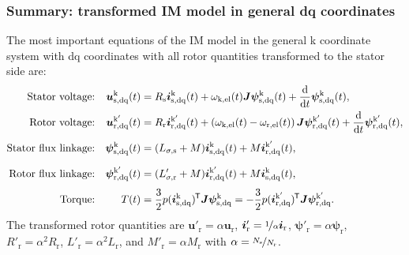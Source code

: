 \begin{frame}
	\frametitle{Summary: transformed IM model in general dq coordinates}
    The most important equations of the IM model in the general k coordinate system with dq coordinates with all rotor quantities transformed to the stator side are:
    \begin{equation*}
        \begin{alignedat}{4}
            &&\mbox{Stator voltage:}&& \quad\bm{u}^\mathrm{k}_\mathrm{s,dq}(&t) &&= R_\mathrm{s} \bm{i}^\mathrm{k}_\mathrm{s,dq}(t)+ \omega_\mathrm{k,el}(t)\bm{J}\bm{\psi}^\mathrm{k}_\mathrm{s,dq}(t) + \frac{\mathrm{d}}{\mathrm{d}t}\bm{\psi}^\mathrm{k}_\mathrm{s,dq}(t),\\
            &&\mbox{Rotor voltage:}&& \quad\bm{u}^{\mathrm{k}'}_\mathrm{r,dq}(&t) &&= R_\mathrm{r} \bm{i}^{\mathrm{k}'}_\mathrm{r,dq}(t)+\left(\omega_\mathrm{k,el}(t)-\omega_\mathrm{r,el}(t)\right)\bm{J}\bm{\psi}^{\mathrm{k}'}_\mathrm{r,dq}(t) +\frac{\mathrm{d}}{\mathrm{d}t}\bm{\psi}^{\mathrm{k}'}_\mathrm{r,dq}(t),\\
            &&\mbox{Stator flux linkage:}&& \quad \bm{\psi}^\mathrm{k}_\mathrm{s,dq}(&t) &&= (L_{\sigma,\mathrm{s}} +M) \bm{i}^\mathrm{k}_\mathrm{s,dq}(t) +  M\bm{i}^{\mathrm{k}'}_\mathrm{r,dq}(t),\vphantom{\frac{\mathrm{d}}{\mathrm{d}t}}\\
            &&\mbox{Rotor flux linkage:}&& \quad \bm{\psi}^{\mathrm{k}'}_\mathrm{r,dq}(&t) &&= (L'_{\sigma,\mathrm{r}} + M) \bm{i}^{\mathrm{k}'}_\mathrm{r,dq}(t) +  M \bm{i}^\mathrm{k}_\mathrm{s,dq}(t)\vphantom{\frac{\mathrm{d}}{\mathrm{d}t}},\\
            &&\mbox{Torque:}&& \quad T(&t) &&= \frac{3}{2} p (\bm{i}_\mathrm{s,dq}^\mathrm{k})\T\bm{J}\bm{\psi}_\mathrm{s,dq}^\mathrm{k}=-\frac{3}{2} p (\bm{i}^{\mathrm{k}'}_\mathrm{r,dq})\T\bm{J}\bm{\psi}^{\mathrm{k}'}_\mathrm{r,dq} \vphantom{\frac{\mathrm{d}}{\mathrm{d}t}}.
        \end{alignedat}
    \end{equation*}
    The transformed rotor quantities are $\bm{u}'_\mathrm{r} = \alpha\bm{u}_\mathrm{r}$, $\bm{i}'_\mathrm{r} = \nicefrac{1}{\alpha}\bm{i}_\mathrm{r}$, $\bm{\psi}'_\mathrm{r} = \alpha\bm{\psi}_\mathrm{r}$, $R'_\mathrm{r} =  \alpha^2 R_\mathrm{r}$, $L'_\mathrm{r} =  \alpha^2 L_\mathrm{r}$, and $M'_\mathrm{r} =  \alpha M_\mathrm{r}$ with $\alpha = \nicefrac{N_\mathrm{s}}{N_\mathrm{r}}$.
\end{frame}


